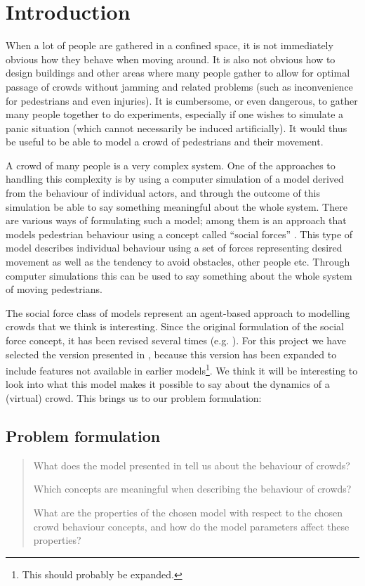 \section{Introduction}
When a lot of people are gathered in a confined space, it is not immediately 
obvious how they behave when moving around. It is also not obvious how to 
design buildings and other areas where many people gather to allow for optimal 
passage of crowds without jamming and related problems (such as inconvenience 
for pedestrians and even injuries). It is cumbersome, or even dangerous, to 
gather many people together to do experiments, especially if one wishes to 
simulate a panic situation (which cannot necessarily be induced artificially).  
It would thus be useful to be able to model a crowd of pedestrians and their 
movement.

A crowd of many people is a very complex system. One of the approaches to 
handling this complexity is by using a computer simulation of a model derived 
from the behaviour of individual actors, and through the outcome of this 
simulation be able to say something meaningful about the whole system. There 
are various ways of formulating such a model; among them is an approach that 
models pedestrian behaviour using a concept called ``social forces'' 
\cite{social-force}. This type of model describes individual behaviour using a 
set of forces representing desired movement as well as the tendency to avoid 
obstacles, other people etc. Through computer simulations this can be used to 
say something about the whole system of moving pedestrians.

The social force class of models represent an agent-based approach to 
modelling crowds that we think is interesting. Since the original formulation 
of the social force concept, it has been revised several times (e.g.  
\cite{helbing00}). For this project we have selected the version presented in 
\cite{self-org}, because this version has been expanded to include features 
not available in earlier models\footnote{This should probably be expanded.}.  
We think it will be interesting to look into what this model makes it possible 
to say about the dynamics of a (virtual) crowd. This brings us to our problem 
formulation:

\subsection{Problem formulation}
\begin{quote}
    What does the model presented in \cite{self-org} tell us about the 
    behaviour of crowds?

    Which concepts are meaningful when describing the behaviour of crowds?

    What are the properties of the chosen model with respect to the chosen 
    crowd behaviour concepts, and how do the model parameters affect these 
    properties?
\end{quote}

